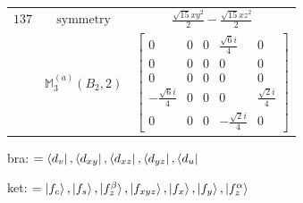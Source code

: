 \documentclass[fleqn,8pt,landscape]{jsarticle}
\begin{document}
\begin{longtable}{ccc}
$ 137 $ & $ \text{symmetry} $ & $ \frac{\sqrt{15} x y^{2}}{2} - \frac{\sqrt{15} x z^{2}}{2} $ \\
$  $ & $ \mathbb{M}_{3}^{(a)}(B_{2},2) $ & $ \begin{bmatrix} 0 & 0 & 0 & \frac{\sqrt{6} i}{4} & 0 \\ 0 & 0 & 0 & 0 & 0 \\ 0 & 0 & 0 & 0 & 0 \\ - \frac{\sqrt{6} i}{4} & 0 & 0 & 0 & \frac{\sqrt{2} i}{4} \\ 0 & 0 & 0 & - \frac{\sqrt{2} i}{4} & 0 \end{bmatrix} $ \\ \hline
\end{longtable}
bra: $=\bra{d_{v}}, \bra{d_{xy}}, \bra{d_{xz}}, \bra{d_{yz}}, \bra{d_{u}}$

\noindent
ket: $=\ket{f_{c}}, \ket{f_{s}}, \ket{f_{z}^{\beta}}, \ket{f_{xyz}}, \ket{f_{x}}, \ket{f_{y}}, \ket{f_{z}^{\alpha}}$
\renewcommand{\arraystretch}{1.6}
\end{document}
